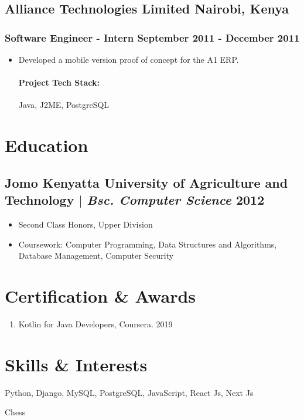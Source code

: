 \documentclass[11pt]{article} %
\begin{document}
\subsection{Alliance Technologies Limited \hfill Nairobi, Kenya}
\subsubsection{Software Engineer - Intern \hfill  September 2011 - December 2011}
\begin{itemize}
    \item Developed a mobile version proof of concept for the A1 ERP. 
    \paragraph{Project Tech Stack:} Java, J2ME, PostgreSQL
\end{itemize}

\section{Education}
\subsection{Jomo Kenyatta University of Agriculture and Technology $|$ {\normalfont\itshape Bsc. Computer Science} \hfill 2012}
\begin{itemize}
    \item Second Class Honors, Upper Division
    \item Coursework: Computer Programming, Data Structures and Algorithms, Database Management, Computer Security
\end{itemize}


\section{Certification \& Awards}
\begin{enumerate}[label=\null, left=0pt..0pt, itemsep=0pt]
        \item Kotlin for Java Developers, Coursera. \hfill 2019
\end{enumerate}

\section{Skills \& Interests}
\begin{description}[itemsep=0pt]
        \item[Technical] Python, Django, MySQL, PostgreSQL, JavaScript, React Js, Next Js 
        \item[Interests] Chess
\end{description}
\end{document}

